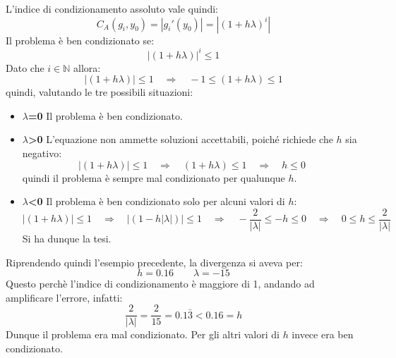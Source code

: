L'indice di condizionamento assoluto vale quindi:
\begin{equation*}
	C_A(g_i,y_0) = |g_i'(y_0)| = |(1+h\lambda)^i|
\end{equation*}
Il problema è ben condizionato se:
\begin{equation*}
	|(1+h\lambda)|^i \leq 1
\end{equation*}
Dato che $i\in \mathbb{N}$ allora:
\begin{equation*}
	|(1+h\lambda)| \leq 1 \quad \Rightarrow \quad -1 \leq (1+h\lambda) \leq 1
\end{equation*}
quindi, valutando le tre possibili situazioni:
\begin{itemize}
	\item \textbf{$\lambda$=0} Il problema è ben condizionato.
	\item \textbf{$\lambda$>0} L'equazione non ammette soluzioni accettabili, poiché richiede che $h$ sia negativo:
	\begin{equation*}
		|(1+h\lambda)| \leq 1 \quad \Rightarrow \quad (1+h\lambda) \leq 1 \quad \Rightarrow \quad h\leq 0
	\end{equation*}
	quindi il problema è sempre mal condizionato per qualunque $h$.
	\item \textbf{$\lambda$<0} Il problema è ben condizionato solo per alcuni valori di $h$:
	\begin{equation*}
		|(1+h\lambda)| \leq 1 \quad \Rightarrow \quad |(1-h|\lambda|)| \leq 1 \quad \Rightarrow \quad 
		-\dfrac{2}{|\lambda|} \leq -h \leq 0 \quad \Rightarrow \quad   0\leq h \leq \dfrac{2}{|\lambda|}
	\end{equation*}
	Si ha dunque la tesi.
\end{itemize}

\begin{example}
	Riprendendo quindi l'esempio precedente, la divergenza si aveva per:
	\begin{equation*}
		h=0.16 \qquad \lambda = -15
	\end{equation*}
	Questo perchè l'indice di condizionamento è maggiore di 1, andando ad amplificare l'errore, infatti:
	\begin{equation*}
		\dfrac{2}{|\lambda|}= \dfrac{2}{15} = 0.1\bar{3} < 0.16 = h
	\end{equation*}
Dunque il problema era mal condizionato. Per gli altri valori di $h$ invece era ben condizionato.
\end{example}


